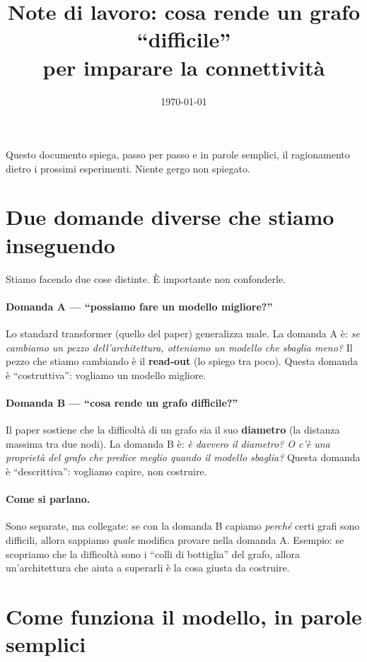 \documentclass[11pt,a4paper]{article}
\title{Note di lavoro: cosa rende un grafo ``difficile''\\ per imparare la connettività}
\author{}
\date{\today}
\begin{document}
\maketitle

Questo documento spiega, passo per passo e in parole semplici, il ragionamento
dietro i prossimi esperimenti. Niente gergo non spiegato.

\section{Due domande diverse che stiamo inseguendo}

Stiamo facendo due cose distinte. È importante non confonderle.

\paragraph{Domanda A --- ``possiamo fare un modello migliore?''}
Lo standard transformer (quello del paper) generalizza male. La domanda A è:
\emph{se cambiamo un pezzo dell'architettura, otteniamo un modello che sbaglia
meno?} Il pezzo che stiamo cambiando è il \textbf{read-out} (lo spiego tra poco).
Questa domanda è ``costruttiva'': vogliamo un modello migliore.

\paragraph{Domanda B --- ``cosa rende un grafo difficile?''}
Il paper sostiene che la difficoltà di un grafo sia il suo \textbf{diametro} (la
distanza massima tra due nodi). La domanda B è: \emph{è davvero il diametro? O
c'è una proprietà del grafo che predice meglio quando il modello sbaglia?}
Questa domanda è ``descrittiva'': vogliamo capire, non costruire.

\paragraph{Come si parlano.} Sono separate, ma collegate: se con la domanda B
capiamo \emph{perché} certi grafi sono difficili, allora sappiamo \emph{quale}
modifica provare nella domanda A. Esempio: se scopriamo che la difficoltà sono i
``colli di bottiglia'' del grafo, allora un'architettura che aiuta a superarli è
la cosa giusta da costruire.

\section{Come funziona il modello, in parole semplici}
\end{document}
